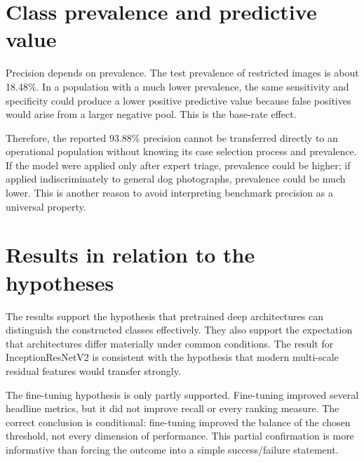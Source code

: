 \section{Class prevalence and predictive value}
Precision depends on prevalence. The test prevalence of restricted images is about 18.48\%. In a population with a much lower prevalence, the same sensitivity and specificity could produce a lower positive predictive value because false positives would arise from a larger negative pool. This is the base-rate effect.

Therefore, the reported 93.88\% precision cannot be transferred directly to an operational population without knowing its case selection process and prevalence. If the model were applied only after expert triage, prevalence could be higher; if applied indiscriminately to general dog photographs, prevalence could be much lower. This is another reason to avoid interpreting benchmark precision as a universal property.

\section{Results in relation to the hypotheses}
The results support the hypothesis that pretrained deep architectures can distinguish the constructed classes effectively. They also support the expectation that architectures differ materially under common conditions. The result for InceptionResNetV2 is consistent with the hypothesis that modern multi-scale residual features would transfer strongly.

The fine-tuning hypothesis is only partly supported. Fine-tuning improved several headline metrics, but it did not improve recall or every ranking measure. The correct conclusion is conditional: fine-tuning improved the balance of the chosen threshold, not every dimension of performance. This partial confirmation is more informative than forcing the outcome into a simple success/failure statement.
